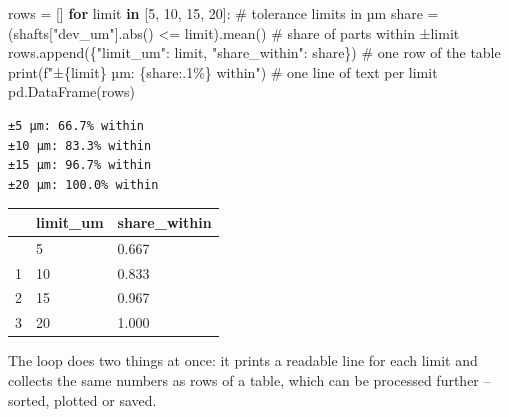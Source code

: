 \documentclass[
  letterpaper,
  DIV=11,
  numbers=noendperiod]{scrreprt}
\newenvironment{Shaded}{\begin{snugshade}}{\end{snugshade}}
\newcommand{\BuiltInTok}[1]{\textcolor[rgb]{0.00,0.23,0.31}{#1}}
\newcommand{\CommentTok}[1]{\textcolor[rgb]{0.37,0.37,0.37}{#1}}
\newcommand{\ControlFlowTok}[1]{\textcolor[rgb]{0.00,0.23,0.31}{\textbf{#1}}}
\newcommand{\DecValTok}[1]{\textcolor[rgb]{0.68,0.00,0.00}{#1}}
\newcommand{\KeywordTok}[1]{\textcolor[rgb]{0.00,0.23,0.31}{\textbf{#1}}}
\newcommand{\NormalTok}[1]{\textcolor[rgb]{0.00,0.23,0.31}{#1}}
\newcommand{\OperatorTok}[1]{\textcolor[rgb]{0.37,0.37,0.37}{#1}}
\newcommand{\SpecialCharTok}[1]{\textcolor[rgb]{0.37,0.37,0.37}{#1}}
\newcommand{\SpecialStringTok}[1]{\textcolor[rgb]{0.13,0.47,0.30}{#1}}
\newcommand{\StringTok}[1]{\textcolor[rgb]{0.13,0.47,0.30}{#1}}
\begin{document}
\begin{tcolorbox}[enhanced jigsaw, left=2mm, title=\textcolor{quarto-callout-caution-color}{\faFire}\hspace{0.5em}{Solution to Exercise 6}, opacityback=0, breakable, rightrule=.15mm, arc=.35mm, toptitle=1mm, colbacktitle=quarto-callout-caution-color!10!white, opacitybacktitle=0.6, coltitle=black, colframe=quarto-callout-caution-color-frame, bottomrule=.15mm, leftrule=.75mm, bottomtitle=1mm, titlerule=0mm, toprule=.15mm, colback=white]

\begin{Shaded}
\begin{Highlighting}[]
\NormalTok{rows }\OperatorTok{=}\NormalTok{ []}
\ControlFlowTok{for}\NormalTok{ limit }\KeywordTok{in}\NormalTok{ [}\DecValTok{5}\NormalTok{, }\DecValTok{10}\NormalTok{, }\DecValTok{15}\NormalTok{, }\DecValTok{20}\NormalTok{]:                                 }\CommentTok{\# tolerance limits in µm}
\NormalTok{    share }\OperatorTok{=}\NormalTok{ (shafts[}\StringTok{"dev\_um"}\NormalTok{].}\BuiltInTok{abs}\NormalTok{() }\OperatorTok{\textless{}=}\NormalTok{ limit).mean()          }\CommentTok{\# share of parts within ±limit}
\NormalTok{    rows.append(\{}\StringTok{"limit\_um"}\NormalTok{: limit, }\StringTok{"share\_within"}\NormalTok{: share\})   }\CommentTok{\# one row of the table}
    \BuiltInTok{print}\NormalTok{(}\SpecialStringTok{f"±}\SpecialCharTok{\{}\NormalTok{limit}\SpecialCharTok{\}}\SpecialStringTok{ µm: }\SpecialCharTok{\{}\NormalTok{share}\SpecialCharTok{:.1\%\}}\SpecialStringTok{ within"}\NormalTok{)                 }\CommentTok{\# one line of text per limit}
\NormalTok{pd.DataFrame(rows)}
\end{Highlighting}
\end{Shaded}

\begin{verbatim}
±5 µm: 66.7% within
±10 µm: 83.3% within
±15 µm: 96.7% within
±20 µm: 100.0% within
\end{verbatim}

\begin{longtable}[]{@{}lll@{}}
\toprule\noalign{}
& limit\_um & share\_within \\
\midrule\noalign{}
\endhead
\bottomrule\noalign{}
\endlastfoot
0 & 5 & 0.667 \\
1 & 10 & 0.833 \\
2 & 15 & 0.967 \\
3 & 20 & 1.000 \\
\end{longtable}

The loop does two things at once: it prints a readable line for each
limit and collects the same numbers as rows of a table, which can be
processed further -- sorted, plotted or saved.

\end{tcolorbox}
\end{document}

